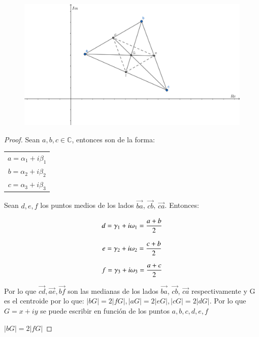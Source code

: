 \documentclass[11pt]{article}
\theoremstyle{Tema} \newtheorem{Tema}{Tema} %
\theoremstyle{Tema} \newtheorem{serie}{Serie}              %
\theoremstyle{Tema} \newtheorem{ejercicio}{Ejercicio}    %
\begin{document}
\begin{figure}[H]
	\centering
	\includegraphics[width=0.7\linewidth]{5}
\end{figure}
\begin{proof}
	


Sean $ a,b,c  \in \mathbb{C}$, entonces son de la forma:
\begin{center}
\begin{tabular}{c}
	$ a= \alpha_1+i\beta_1 $\\  
	$ b= \alpha_2+i\beta_2 $\\ 
	$ c= \alpha_3+i\beta_3 $\\ 
\end{tabular} 	
\end{center}

Sean $ d, e, f $ los puntos medios de los lados $ \vec{ba} $, $ \vec{cb} $, $ \vec{ca} $. Entonces:

\begin{center}
	\begin{equation}
	\begin{tabular}{c}
		$ d=\gamma_1+i\omega_1= \dfrac{a+b}{2} $\\
		\\  
		$ e= \gamma_2+i\omega_2=\dfrac{c+b}{2} $\\ 
		\\
		$ f=\gamma_3+i\omega_3= \dfrac{a+c}{2}$\\ 
	\end{tabular} 	
	\end{equation}
\end{center}

Por lo que $  \vec{cd} , \vec{ae},\vec{bf}$ son las medianas de los lados $ \vec{ba} $, $ \vec{cb} $, $ \vec{ca} $ respectivamente y G es el centroide por lo que: $|bG|=2|fG|, |aG|=2|eG|, |cG|=2|dG|   $. Por lo que $ G=x +iy $ se puede escribir en funci\'on de los puntos $ a,b,c,d,e,f$


$ |bG|=2|fG| $



\end{proof}
\end{document}
